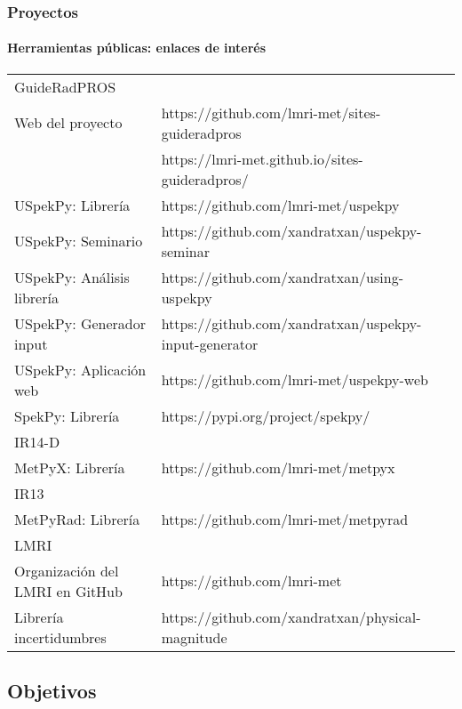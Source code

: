 \documentclass{beamer}
\begin{document}
	\begin{frame}
		\frametitle{Proyectos}
		\framesubtitle{Herramientas públicas: enlaces de interés}
		\centering
		\scriptsize
		\begin{tabular}{ll}			
			\rowcolor{blue!40}
			{\color{white}GuideRadPROS}&\\
			Web del proyecto&https://github.com/lmri-met/sites-guideradpros\\
			&https://lmri-met.github.io/sites-guideradpros/\\
			USpekPy: Librería&https://github.com/lmri-met/uspekpy\\
			USpekPy: Seminario&https://github.com/xandratxan/uspekpy-seminar\\
			USpekPy: Análisis librería&https://github.com/xandratxan/using-uspekpy\\
			USpekPy: Generador input&https://github.com/xandratxan/uspekpy-input-generator\\
			USpekPy: Aplicación web&https://github.com/lmri-met/uspekpy-web\\
			SpekPy: Librería&https://pypi.org/project/spekpy/\\
			\rowcolor{blue!40}
			{\color{white}IR14-D}&\\
			MetPyX: Librería&https://github.com/lmri-met/metpyx\\
			\rowcolor{blue!40}
			{\color{white}IR13}&\\
			MetPyRad: Librería&https://github.com/lmri-met/metpyrad\\
			\rowcolor{blue!40}
			{\color{white}LMRI}&\\
			Organización del LMRI en GitHub&https://github.com/lmri-met\\
			Librería incertidumbres&https://github.com/xandratxan/physical-magnitude\\
		\end{tabular}
	\end{frame}
	
	\subsection{Objetivos}
\end{document}
